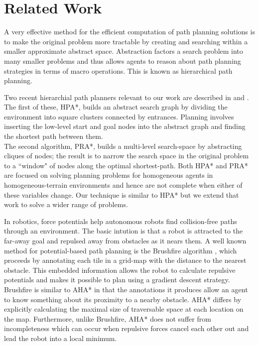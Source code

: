\section{Related Work}
A very effective method for the efficient computation of path planning solutions is to make the original problem more tractable by creating and searching within a smaller approximate abstract space. Abstraction factors a search problem into many smaller problems and thus allows agents to reason about path planning strategies in terms of macro operations. This is known as hierarchical path planning. 
\par
\indent Two recent hierarchial path planners relevant to our work are described in \cite{botea04} and \cite{sturtevant05}. The first of these, HPA*, builds an  abstract search graph by dividing the environment into square clusters connected by entrances. Planning involves inserting the low-level start and goal nodes into the abstract graph and finding the shortest path between them. \\
The second algorithm, PRA*, builds a multi-level search-space by abstracting cliques of nodes; the result is to narrow the search space in the original problem to a ``window" of nodes along the optimal shortest-path.
Both HPA* and PRA* are focused on solving planning problems for homogeneous agents in homogeneous-terrain environments and hence are not complete when either of these variables change. 
Our technique is similar to HPA* but we extend that work to solve a wider range of problems. 
\par 
\indent In robotics, force potentials help autonomous robots find collision-free paths through an environment. The basic intution is that a robot is attracted to the far-away goal and repulsed away from obstacles as it nears them. A well known method for potential-based path planning is the Brushfire algorithm \cite{latombe91}, which proceeds by annotating each tile in a grid-map with the distance to the nearest obstacle. This embedded information allows the robot to calculate repulsive potentials and makes it possible to plan using a gradient descent strategy. 
Brushfire is similar to AHA* in that the annotations it produces allow an agent to know something about its proximity to a nearby obstacle. 
AHA* differs by explicitly calculating the maximal size of traversable space at each location on the map. 
Furthermore, unlike Brushfire, AHA* does not suffer from incompleteness which can occur when repulsive forces cancel each other out and lead the robot into a local minimum. 
\par
